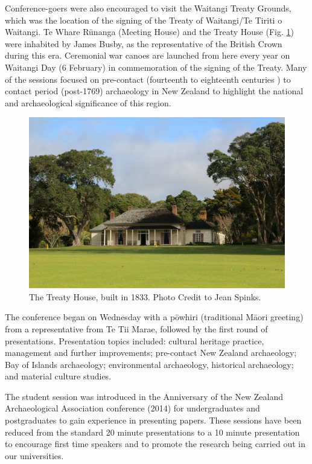 Conference-goers were also encouraged to visit the Waitangi Treaty Grounds, which was the location of the signing of the Treaty of Waitangi/Te Tiriti o Waitangi. Te Whare Rūnanga (Meeting House) and the Treaty House (Fig. \ref{fig:NZAA_Fig5}) were inhabited by James Busby, as the representative of the British Crown during this era. Ceremonial war canoes are launched from here every year on Waitangi Day (6 February) in commemoration of the signing of the Treaty. Many of the sessions focused on pre-contact (fourteenth to eighteenth centuries \AD) to contact period (post-1769) archaeology in New Zealand to highlight the national and archaeological significance of this region.

	\begin{figure}
		\includegraphics[width=\linewidth]{figures/NZAA_Fig5.jpg}
		\centering
		\caption{The Treaty House, built in 1833. Photo Credit to Jean Spinks.}
		\label{fig:NZAA_Fig5}
	\end{figure}

The conference began on Wednesday with a pōwhiri (traditional Māori greeting) from a representative from Te Tii Marae, followed by the first round of presentations. Presentation topics included: cultural heritage practice, management and further improvements; pre-contact New Zealand archaeology; Bay of Islands archaeology; environmental archaeology, historical archaeology; and material culture studies. 

The student session was introduced in the  Anniversary of the New Zealand Archaeological Association conference (2014) for undergraduates and postgraduates to gain experience in presenting papers. These sessions have been reduced from the standard 20 minute presentations to a 10 minute presentation to encourage first time speakers and to promote the research being carried out in our universities.

